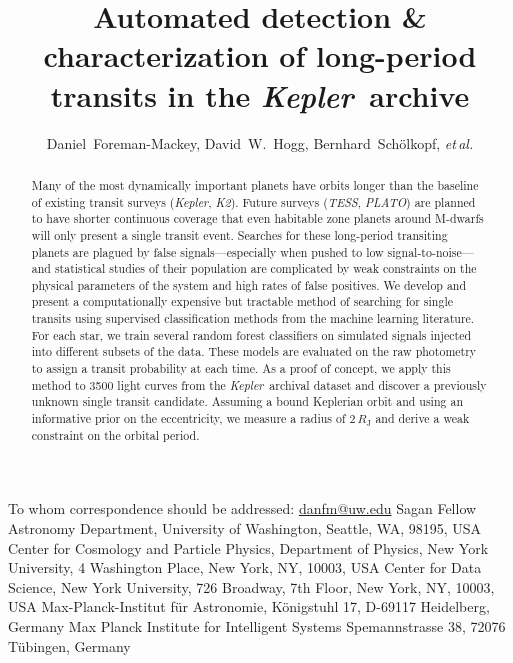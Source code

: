 \documentclass[12pt,preprint]{aastex}
\newcommand{\project}[1]{\textsl{#1}}
\newcommand{\kepler}{\project{Kepler}}
\newcommand{\KT}{\project{K2}}
\newcommand{\tess}{\project{TESS}}
\newcommand{\plato}{\project{PLATO}}
\newcommand{\foreign}[1]{\emph{#1}}
\newcommand{\etal}{\foreign{et\,al.}}
\begin{document}
\title{%
Automated detection \& characterization of long-period transits in the
\kepler\ archive
}

\newcommand{\uw}{3}
\newcommand{\nyu}{4}
\newcommand{\cds}{5}
\newcommand{\mpia}{6}
\newcommand{\mpis}{7}
\author{%
    Daniel~Foreman-Mackey\altaffilmark{1,2,\uw},
    David~W.~Hogg\altaffilmark{\nyu,\mpia,\cds},
    Bernhard~Sch\"olkopf\altaffilmark{\mpis},
    \etal
}
         {To whom correspondence should be addressed:
                          \url{danfm@uw.edu}}
         {Sagan Fellow}
\altaffiltext{\uw}       {Astronomy Department, University of Washington,
                          Seattle, WA, 98195, USA}
\altaffiltext{\nyu}      {Center for Cosmology and Particle Physics,
                          Department of Physics, New York University,
                          4 Washington Place, New York, NY, 10003, USA}
\altaffiltext{\cds}      {Center for Data Science, New York University,
                          726 Broadway, 7th Floor, New York, NY, 10003, USA}
\altaffiltext{\mpia}     {Max-Planck-Institut f\"ur Astronomie,
                          K\"onigstuhl 17, D-69117 Heidelberg, Germany}
\altaffiltext{\mpis}     {Max Planck Institute for Intelligent Systems
                          Spemannstrasse 38, 72076 T\"ubingen, Germany}

\begin{abstract}

Many of the most dynamically important planets have orbits longer than the
baseline of existing transit surveys (\kepler, \KT).
Future surveys (\tess, \plato) are planned to have shorter continuous coverage
that even habitable zone planets around M-dwarfs will only present a single
transit event.
Searches for these long-period transiting planets are plagued by false
signals---especially when pushed to low signal-to-noise---and statistical
studies of their population are complicated by weak constraints on the
physical parameters of the system and high rates of false positives.
We develop and present a computationally expensive but tractable method of
searching for single transits using supervised classification methods from
the machine learning literature.
For each star, we train several random forest classifiers on simulated signals
injected into different subsets of the data.
These models are evaluated on the raw photometry to assign a transit
probability at each time.
As a proof of concept, we apply this method to 3500 light curves from the
\kepler\ archival dataset and discover a previously unknown single transit
candidate.
Assuming a bound Keplerian orbit and using an informative prior on the
eccentricity, we measure a radius of $2\,R_\mathrm{J}$ and derive a weak
constraint on the orbital period.

\end{abstract}
\end{document}
